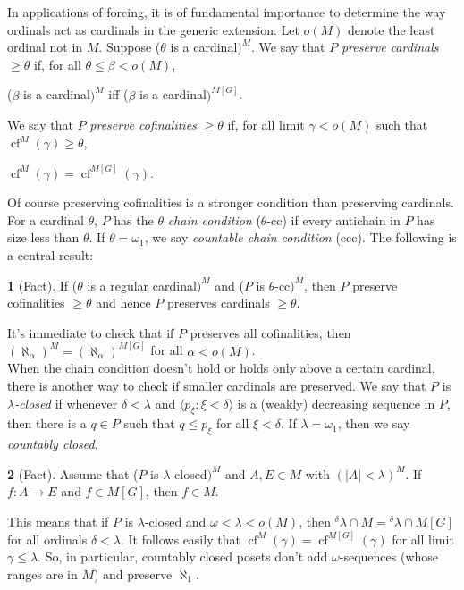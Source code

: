 \documentclass[11pt,a4paper]{report}
\theoremstyle{definition}
\theoremstyle{num.custom-title}
\theoremstyle{custom-title}
\newtheorem*{teo_custom-title_nonum}{}
\DeclareMathOperator{\cf}{cf}
\begin{document}
In applications of forcing, it is of fundamental importance to determine the way ordinals act as cardinals in the generic extension. Let $o(M)$ denote the least ordinal not in $M$. Suppose ($\theta$ is a cardinal$)^M$. We say that $P$ \emph{preserve cardinals} $\geq \theta$ if, for all $\theta \leq \beta < o(M)$,
\begin{center}
($\beta$ is a cardinal$)^M$ iff ($\beta$ is a cardinal$)^{M[G]}$.
\end{center}
We say that $P$ \emph{preserve cofinalities} $\geq \theta$ if, for all limit $\gamma < o(M)$ such that $\cf^M (\gamma) \geq \theta$,
\begin{center}
$\cf^M (\gamma) = \cf^{M[G]} (\gamma)$.
\end{center}
Of course preserving cofinalities is a stronger condition than preserving cardinals.\\
For a cardinal $\theta$, $P$ has the $\theta$ \emph{chain condition} ($\theta$-cc) if every antichain in $P$ has size less than $\theta$. If $\theta=\omega_1$, we say \emph{countable chain condition} (ccc). The following is a central result:
\begin{teo_custom-title_nonum}[Fact]
If ($\theta$ is a regular cardinal$)^M$ and ($P$ is $\theta$-cc$)^M$, then $P$ preserve cofinalities $\geq \theta$ and hence $P$ preserves cardinals $\geq \theta$.
\end{teo_custom-title_nonum}
It's immediate to check that if $P$ preserves all cofinalities, then $(\aleph_\alpha)^M = (\aleph_\alpha)^{M[G]}$ for all $\alpha < o(M)$.\\
When the chain condition doesn't hold or holds only above a certain cardinal, there is another way to check if smaller cardinals are preserved. We say that $P$ is \emph{$\lambda$-closed} if whenever $\delta < \lambda$ and $\langle p_\xi : \xi < \delta \rangle$ is a (weakly) decreasing sequence in $P$, then there is a $q \in P$ such that $q \leq p_\xi$ for all $\xi < \delta$. If $\lambda=\omega_1$, then we say \emph{countably closed}.
\begin{teo_custom-title_nonum}[Fact]
Assume that ($P$ is $\lambda$-closed$)^M$ and $A,E \in M$ with $(|A| < \lambda)^M$. If $f \colon A \to E$ and $f \in M[G]$, then $f \in M$.
\end{teo_custom-title_nonum}
This means that if $P$ is $\lambda$-closed and $\omega < \lambda < o(M)$, then ${}^\delta \lambda \cap M = {}^\delta \lambda \cap M[G]$ for all ordinals $\delta < \lambda$. It follows easily that $\cf^M(\gamma) = \cf^{M[G]}(\gamma)$ for all limit $\gamma \leq \lambda$. So, in particular, countably closed posets don't add $\omega$-sequences (whose ranges are in $M$) and preserve $\aleph_1$.
\end{document}
